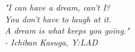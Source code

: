 \titleformat{\chapter}{\normalfont\huge \bfseries}{\Huge \thechapter}{20pt}{\Huge}

\newpage
\thispagestyle{empty}
\mbox{} %

\newpage

\thispagestyle{empty}

\vspace*{5cm} %

\begin{flushright} %
    {\large\itshape "I can have a dream, can't I?\\You don't have to laugh at it.\\A dream is what keeps you going."\\
    - Ichiban Kasuga, Y:LAD
}
\end{flushright}
\newpage
\thispagestyle{empty}
\mbox{} %


